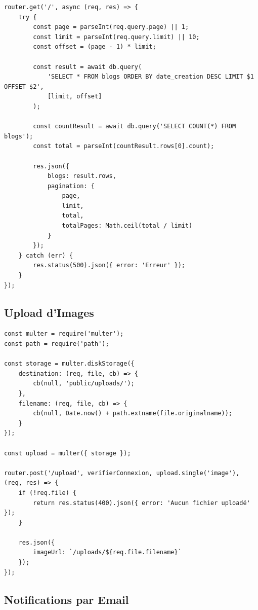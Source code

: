 \begin{lstlisting}[style=javascript, caption=Route avec pagination]
router.get('/', async (req, res) => {
    try {
        const page = parseInt(req.query.page) || 1;
        const limit = parseInt(req.query.limit) || 10;
        const offset = (page - 1) * limit;
        
        const result = await db.query(
            'SELECT * FROM blogs ORDER BY date_creation DESC LIMIT $1 OFFSET $2',
            [limit, offset]
        );
        
        const countResult = await db.query('SELECT COUNT(*) FROM blogs');
        const total = parseInt(countResult.rows[0].count);
        
        res.json({
            blogs: result.rows,
            pagination: {
                page,
                limit,
                total,
                totalPages: Math.ceil(total / limit)
            }
        });
    } catch (err) {
        res.status(500).json({ error: 'Erreur' });
    }
});
\end{lstlisting}

\subsection{Upload d'Images}

\begin{lstlisting}[style=javascript, caption=Upload d'images avec Multer]
const multer = require('multer');
const path = require('path');

const storage = multer.diskStorage({
    destination: (req, file, cb) => {
        cb(null, 'public/uploads/');
    },
    filename: (req, file, cb) => {
        cb(null, Date.now() + path.extname(file.originalname));
    }
});

const upload = multer({ storage });

router.post('/upload', verifierConnexion, upload.single('image'), (req, res) => {
    if (!req.file) {
        return res.status(400).json({ error: 'Aucun fichier uploadé' });
    }
    
    res.json({ 
        imageUrl: `/uploads/${req.file.filename}` 
    });
});
\end{lstlisting}

\subsection{Notifications par Email}

